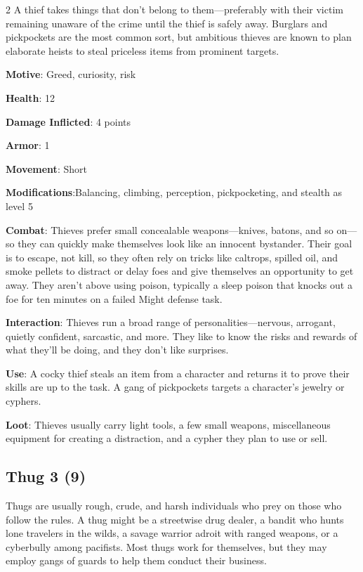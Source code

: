 \begin{multicols}{2}
A thief takes things that don’t belong to them—preferably with their victim remaining unaware of the crime until the thief is safely away. Burglars and pickpockets are the most common sort, but ambitious thieves are known to plan elaborate heists to steal priceless items from prominent targets. 

\textbf{Motive}: Greed, curiosity, risk 

\textbf{Health}: 12 

\textbf{Damage Inflicted}: 4 points 

\textbf{Armor}: 1 

\textbf{Movement}: Short 

\textbf{Modifications}:Balancing, climbing, perception, pickpocketing, and stealth as level 5 

\textbf{Combat}: Thieves prefer small concealable weapons—knives, batons, and so on—so they can quickly make themselves look like an innocent bystander. Their goal is to escape, not kill, so they often rely on tricks like caltrops, spilled oil, and smoke pellets to distract or delay foes and give themselves an opportunity to get away. They aren’t above using poison, typically a sleep poison that knocks out a foe for ten minutes on a failed Might defense task.

\textbf{Interaction}: Thieves run a broad range of personalities—nervous, arrogant, quietly confident, sarcastic, and more. They like to know the risks and rewards of what they’ll be doing, and they don’t like surprises. 

\textbf{Use}: A cocky thief steals an item from a character and returns it to prove their skills are up to the task. A gang of pickpockets targets a character’s jewelry or cyphers. 

\textbf{Loot}: Thieves usually carry light tools, a few small weapons, miscellaneous equipment for creating a distraction, and a cypher they plan to use or sell.

\subsection{Thug	3 (9)}

Thugs are usually rough, crude, and harsh individuals who prey on those who follow the rules. A thug might be a streetwise drug dealer, a bandit who hunts lone travelers in the wilds, a savage warrior adroit with ranged weapons, or a cyberbully among pacifists. Most thugs work for themselves, but they may employ gangs of guards to help them conduct their business.


\end{multicols}
